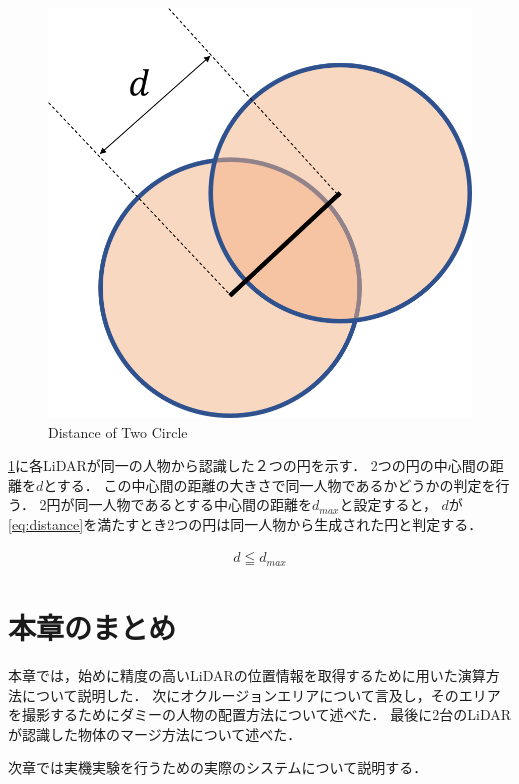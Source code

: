 \documentclass[autodetect-engine,dvipdfmx-if-dvi,ja=standard,a4j,jbase=11pt,magstyle=nomag*]{bxjsreport}
\begin{document}
\begin{figure}[h]
    \centering
    \includegraphics[width=0.6\linewidth, clip]{./figure/chapter3/merge_circle.png}
    \caption{Distance of Two Circle}
    \label{fig:merge}
\end{figure}

\cref{fig:merge}に各LiDARが同一の人物から認識した２つの円を示す．
2つの円の中心間の距離を$d$とする．
この中心間の距離の大きさで同一人物であるかどうかの判定を行う．
2円が同一人物であるとする中心間の距離を$d_{max}$と設定すると，
$d$が\cref{eq:distance}を満たすとき2つの円は同一人物から生成された円と判定する．

\begin{equation}
    \begin{aligned}
        d \leqq d_{max}
    \end{aligned}
    \label{eq:distance}
\end{equation}

\section{本章のまとめ}
本章では，始めに精度の高いLiDARの位置情報を取得するために用いた演算方法について説明した．
次にオクルージョンエリアについて言及し，そのエリアを撮影するためにダミーの人物の配置方法について述べた．
最後に2台のLiDARが認識した物体のマージ方法について述べた．

次章では実機実験を行うための実際のシステムについて説明する．
\end{document}
